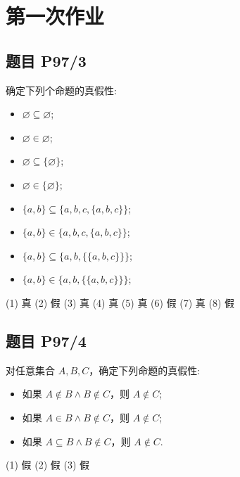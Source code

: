 \chapter{第一次作业}

\section*{题目 P97/3}

	确定下列个命题的真假性:
	
	\begin{itemize}[leftmargin=1.5cm]
		\item[(1)] $\varnothing \subseteq \varnothing$;
		\item[(2)] $\varnothing \in \varnothing$;
		\item[(3)] $\varnothing \subseteq \{\varnothing\}$;
		\item[(4)] $\varnothing \in \{\varnothing\}$;
		\item[(5)] $\{a,b\} \subseteq \{a,b,c,\{a,b,c\}\}$;
		\item[(6)] $\{a,b\} \in \{a,b,c,\{a,b,c\}\}$;
		\item[(7)] $\{a,b\} \subseteq \{a,b,\{\{a,b,c\}\}\}$;
		\item[(8)] $\{a,b\} \in \{a,b,\{\{a,b,c\}\}\}$;
	\end{itemize}
	
	\begin{solution}
		(1) 真
		(2) 假
		(3) 真
		(4) 真
		(5) 真
		(6) 假
		(7) 真
		(8) 假
	\end{solution}

\section*{题目 P97/4}

对任意集合 $A,B,C$，确定下列命题的真假性:

\begin{itemize}[leftmargin=1.5cm]
	\item[(1)] 如果 $A\not\in B \wedge B \not\in C$，则 $A\not\in C$;
	\item[(2)] 如果 $A\in B \wedge B \not\in C$，则 $A\not\in C$;
	\item[(3)] 如果 $A\subseteq B \wedge B \not\in C$，则 $A\not\in C$.
	
\end{itemize}

\begin{solution}
	(1) 假
	(2) 假
	(3) 假
\end{solution}

